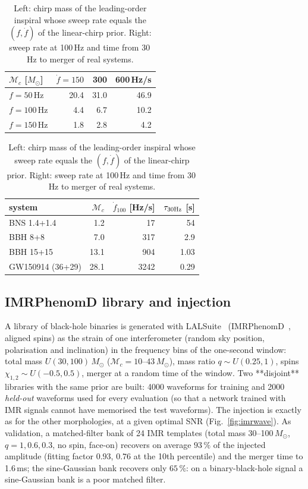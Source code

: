 \begin{table}[h]\centering\small
\begin{tabular}{lrrr}
\toprule
$\mathcal M_c$ [$M_\odot$] & $\dot f=150$ & 300 & 600\,Hz/s\\
\midrule
$f=50$\,Hz & 20.4 & 31.0 & 46.9\\
$f=100$\,Hz & 4.4 & 6.7 & 10.2\\
$f=150$\,Hz & 1.8 & 2.8 & 4.2\\
\bottomrule
\end{tabular}\hfill
\begin{tabular}{lrrr}
\toprule
system & $\mathcal M_c$ & $\dot f_{100}$ [Hz/s] & $\tau_{30\rm Hz}$ [s]\\
\midrule
BNS 1.4+1.4 & 1.2 & 17 & 54\\
BBH 8+8 & 7.0 & 317 & 2.9\\
BBH 15+15 & 13.1 & 904 & 1.03\\
GW150914 (36+29) & 28.1 & 3242 & 0.29\\
\bottomrule
\end{tabular}
\caption{Left: chirp mass of the leading-order inspiral whose sweep rate equals the $(f,\dot f)$ of the linear-chirp prior. Right: sweep rate at 100\,Hz and time from 30\,Hz to merger of real systems.}\label{tab:mc}
\end{table}

\subsection{IMRPhenomD library and injection}
A library of black-hole binaries is generated with LALSuite~\cite{LALSuite} (IMRPhenomD~\cite{IMRPhenomD}, aligned spins) as the strain of one interferometer (random sky position, polarisation and inclination) in the frequency bins of the one-second window: total mass $U(30,100)\,M_\odot$ ($\mathcal M_c=10$--$43\,M_\odot$), mass ratio $q\sim U(0.25,1)$, spins $\chi_{1,2}\sim U(-0.5,0.5)$, merger at a random time of the window. Two **disjoint** libraries with the same prior are built: 4000 waveforms for training and 2000 \emph{held-out} waveforms used for every evaluation (so that a network trained with IMR signals cannot have memorised the test waveforms). The injection is exactly as for the other morphologies, at a given optimal SNR (Fig.~\ref{fig:imrwave}). As validation, a matched-filter bank of 24 IMR templates (total mass 30--100\,$M_\odot$, $q=1,0.6,0.3$, no spin, face-on) recovers on average $93\,\%$ of the injected amplitude (fitting factor $0.93$, $0.76$ at the 10th percentile) and the merger time to 1.6\,ms; the sine-Gaussian bank recovers only $65\,\%$: on a binary-black-hole signal a sine-Gaussian bank is a poor matched filter.

